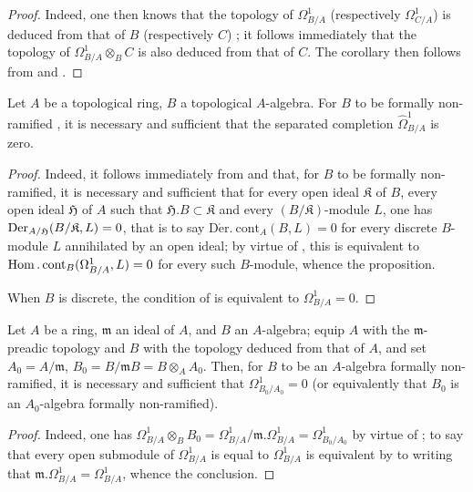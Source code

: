 \begin{proof}
Indeed, one then knows that the topology of $\Omega^1_{B/A}$ (respectively $\Omega^1_{C/A}$) is deduced from that of $B$ (respectively $C$) ; it follows immediately that the topology of $\Omega^1_{B/A}\otimes_B C$ is also deduced from that of $C$. The corollary then follows from  and .
\end{proof}

\begin{proposition}[20.7.4]
\label{0.20.7.4}
Let $A$ be a topological ring, $B$ a topological $A$-algebra.
For $B$ to be formally non-ramified , it is necessary and sufficient that the separated completion $\widehat{\Omega}^1_{B/A}$ is zero.
\end{proposition}

\begin{proof}
Indeed, it follows immediately from  and  that, for $B$ to be formally non-ramified, it is necessary and sufficient that for every open ideal $\mathfrak{K}$ of $B$, every open ideal $\mathfrak{H}$ of $A$ such that $\mathfrak{H}.B\subset\mathfrak{K}$ and every $(B/\mathfrak{K})$-module $L$, one has $\operatorname{Der}_{A/\mathfrak{H}}(B/\mathfrak{K},L)=0$, that is to say $\operatorname{D\acute{e}r.\ cont}_A(B,L)=0$ for every discrete $B$-module $L$ annihilated by an open ideal; by virtue of , this is equivalent to $\operatorname{Hom}.\operatorname{cont}_B(\Omega^1_{B/A},L)=0$ for every such $B$-module, whence the proposition.

When $B$ is discrete, the condition of  is equivalent to $\Omega^1_{B/A}=0$.
\end{proof}

\begin{corollary}[20.7.5]
\label{0.20.7.5}
Let $A$ be a ring, $\mathfrak{m}$ an ideal of $A$, and $B$ an $A$-algebra; equip $A$ with the $\mathfrak{m}$-preadic topology and $B$ with the topology deduced from that of $A$, and set $A_0=A/\mathfrak{m}$, $B_0=B/\mathfrak{m}B=B\otimes_A A_0$.
Then, for $B$ to be an $A$-algebra formally non-ramified, it is necessary and sufficient that $\Omega^1_{B_0/A_0}=0$ \textup{(or equivalently that $B_0$ is an} $A_0$-algebra formally non-ramified\textup{)}.
\end{corollary}

\begin{proof}
Indeed, one has $\Omega^1_{B/A}\otimes_B B_0=\Omega^1_{B/A}/\mathfrak{m}.\Omega^1_{B/A}=\Omega^1_{B_0/A_0}$ by virtue of ; to say that every open submodule of $\Omega^1_{B/A}$ is equal to $\Omega^1_{B/A}$ is equivalent by  to writing that $\mathfrak{m}.\Omega^1_{B/A}=\Omega^1_{B/A}$, whence the conclusion.
\end{proof}


